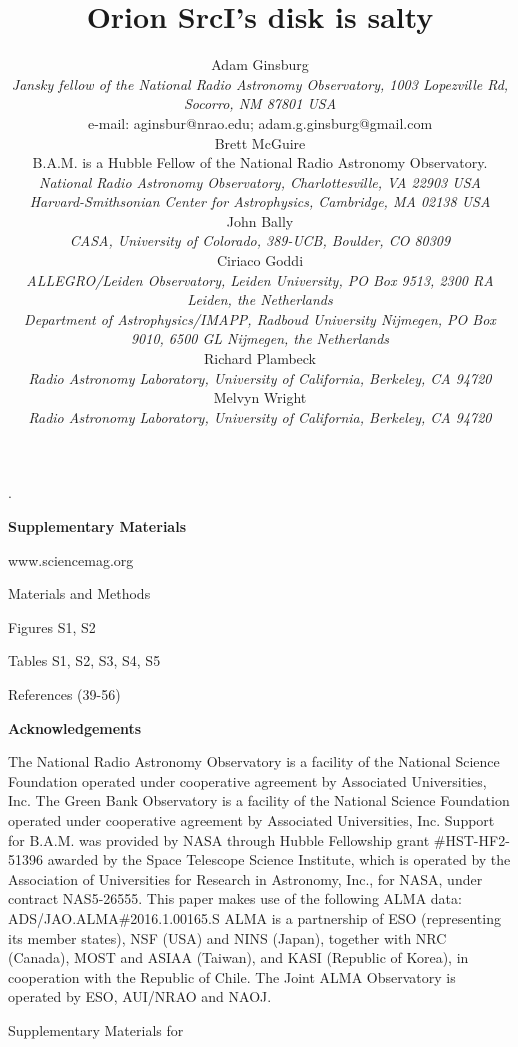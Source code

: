 \documentclass[12pt]{article}
\newcounter{lastnote}
\newenvironment{scilastnote}{%
\setcounter{lastnote}{\value{enumiv}}%
\addtocounter{lastnote}{+1}%
\begin{list}%
{\arabic{lastnote}.}
{\setlength{\leftmargin}{.22in}}
{\setlength{\labelsep}{.5em}}}
{\end{list}}
\newcommand{\nraojansky}{\footnotesize{\it{Jansky fellow of the National Radio Astronomy Observatory, 1003 Lopezville Rd, Socorro, NM 87801 USA }}}
\newcommand{\nraocv}{\footnotesize{\it{National Radio Astronomy Observatory, Charlottesville, VA 22903 USA }}}
\newcommand{\cfa}{\footnotesize{\it{Harvard-Smithsonian Center for Astrophysics, Cambridge, MA 02138 USA }}}
\newcommand{\hubble}{\footnotesize{B.A.M. is a Hubble Fellow of the National Radio Astronomy Observatory.}}
\newcommand{\radboud}{\footnotesize{\it{Department of Astrophysics/IMAPP, Radboud University Nijmegen, PO Box 9010, 6500 GL Nijmegen, the Netherlands}}}
\newcommand{\allegro}{\footnotesize{\it{ALLEGRO/Leiden Observatory, Leiden University, PO Box 9513, 2300 RA Leiden, the Netherlands}}}
\newcommand{\casa}{\footnotesize{\it{CASA, University of Colorado, 389-UCB, Boulder, CO 80309}} }
\newcommand{\berkeley}{\footnotesize{\it{Radio Astronomy Laboratory, University of California, Berkeley, CA 94720}} }
\newcommand{\sourcei}{SrcI\xspace}
\begin{document}
\begin{scilastnote}
\item[] \textbf{Supplementary Materials}

\vspace{-1em}
www.sciencemag.org

\vspace{-1em}
Materials and Methods

\vspace{-1em}
Figures S1, S2

\vspace{-1em}
Tables S1, S2, S3, S4, S5

\vspace{-1em}
References (39-56)

\item[] \textbf{Acknowledgements}
\item[] 
The National Radio Astronomy Observatory is a facility of the National Science
Foundation operated under cooperative agreement by Associated Universities,
Inc. The Green Bank Observatory is a facility of the National Science
Foundation operated under cooperative agreement by Associated Universities,
Inc. Support for B.A.M. was provided by NASA through Hubble Fellowship grant
\#HST-HF2-51396 awarded by the Space Telescope Science Institute, which is
operated by the Association of Universities for Research in Astronomy, Inc.,
for NASA, under contract NAS5-26555. 
This paper makes use of the following ALMA data: ADS/JAO.ALMA\#2016.1.00165.S
ALMA is a partnership of ESO (representing its member states), NSF (USA) and
NINS (Japan), together with NRC (Canada), MOST and ASIAA (Taiwan), and KASI
(Republic of Korea), in cooperation with the Republic of Chile. The Joint ALMA
Observatory is operated by ESO, AUI/NRAO and NAOJ.



\clearpage

Supplementary Materials for


\title{Orion \sourcei's disk is salty}

\author{
Adam Ginsburg\\
\nraojansky\\
e-mail: aginsbur@nrao.edu; adam.g.ginsburg@gmail.com\\
Brett McGuire\\
\hubble\\
\nraocv\\
\cfa\\
John Bally\\
\casa\\
Ciriaco Goddi\\
\allegro\\
\radboud\\
Richard Plambeck\\
\berkeley\\
Melvyn Wright\\
\berkeley\\
}




\end{scilastnote}
\end{document}

